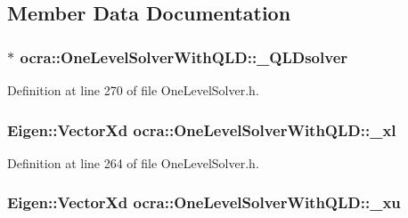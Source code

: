 \subsection{Member Data Documentation}
\subsubsection[{\texorpdfstring{\+\_\+\+Q\+L\+Dsolver}{_QLDsolver}}]{$\ast$ ocra\+::\+One\+Level\+Solver\+With\+Q\+L\+D\+::\+\_\+\+Q\+L\+Dsolver\hspace{0.3cm}{\ttfamily [protected]}}\hypertarget{classocra_1_1OneLevelSolverWithQLD_aa7fbbc63b0e6654166aedee4c067af26}{}\label{classocra_1_1OneLevelSolverWithQLD_aa7fbbc63b0e6654166aedee4c067af26}


Definition at line 270 of file One\+Level\+Solver.\+h.

\subsubsection[{\texorpdfstring{\+\_\+xl}{_xl}}]{\setlength{\rightskip}{0pt plus 5cm}Eigen\+::\+Vector\+Xd ocra\+::\+One\+Level\+Solver\+With\+Q\+L\+D\+::\+\_\+xl\hspace{0.3cm}{\ttfamily [protected]}}\hypertarget{classocra_1_1OneLevelSolverWithQLD_add5b646798e6e18dd3baa6153e42ed3a}{}\label{classocra_1_1OneLevelSolverWithQLD_add5b646798e6e18dd3baa6153e42ed3a}


Definition at line 264 of file One\+Level\+Solver.\+h.

\subsubsection[{\texorpdfstring{\+\_\+xu}{_xu}}]{\setlength{\rightskip}{0pt plus 5cm}Eigen\+::\+Vector\+Xd ocra\+::\+One\+Level\+Solver\+With\+Q\+L\+D\+::\+\_\+xu\hspace{0.3cm}{\ttfamily [protected]}}\hypertarget{classocra_1_1OneLevelSolverWithQLD_af2f22245e4805d0206f70171503501b5}{}\label{classocra_1_1OneLevelSolverWithQLD_af2f22245e4805d0206f70171503501b5}


